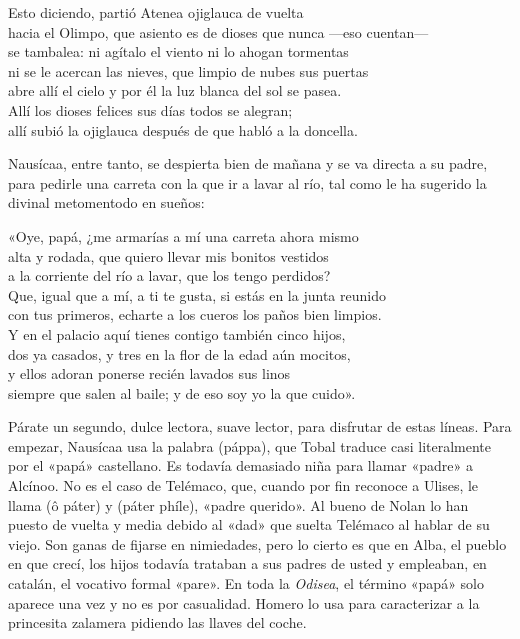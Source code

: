 \begin{versocita}
Esto diciendo, partió Atenea ojiglauca de vuelta\\
hacia el Olimpo, que asiento es de dioses que nunca ---eso cuentan---\\
se tambalea: ni agítalo el viento ni lo ahogan tormentas\\
ni se le acercan las nieves, que limpio de nubes sus puertas\\
abre allí el cielo y por él la luz blanca del sol se pasea.\\
Allí los dioses felices sus días todos se alegran;\\
allí subió la ojiglauca después de que habló a la doncella.
\end{versocita}

Nausícaa, entre tanto, se despierta bien de mañana y se va directa a su padre, para pedirle una carreta con la que ir a lavar al río, tal como le ha sugerido la divinal metomentodo en sueños:

\begin{versocita}
«Oye, papá, ¿me armarías a mí una carreta ahora mismo\\
alta y rodada, que quiero llevar mis bonitos vestidos\\
a la corriente del río a lavar, que los tengo perdidos?\\
Que, igual que a mí, a ti te gusta, si estás en la junta reunido\\
con tus primeros, echarte a los cueros los paños bien limpios.\\
Y en el palacio aquí tienes contigo también cinco hijos,\\
dos ya casados, y tres en la flor de la edad aún mocitos,\\
y ellos adoran ponerse recién lavados sus linos\\
siempre que salen al baile; y de eso soy yo la que cuido».
\end{versocita}

Párate un segundo, dulce lectora, suave lector, para disfrutar de estas líneas. Para empezar, Nausícaa usa la palabra  (páppa), que Tobal traduce casi literalmente por el «papá» castellano. Es todavía demasiado niña para llamar «padre» a Alcínoo. No es el caso de Telémaco, que, cuando por fin reconoce a Ulises, le llama  (ô páter) y  (páter phíle), «padre querido». Al bueno de Nolan lo han puesto de vuelta y media debido al «dad» que suelta Telémaco al hablar de su viejo. Son ganas de fijarse en nimiedades, pero lo cierto es que en Alba, el pueblo en que crecí, los hijos todavía trataban a sus padres de usted y empleaban, en catalán, el vocativo formal «pare». En toda la \emph{Odisea}, el término «papá» solo aparece una vez y no es por casualidad. Homero lo usa para caracterizar a la princesita zalamera pidiendo las llaves del coche.

